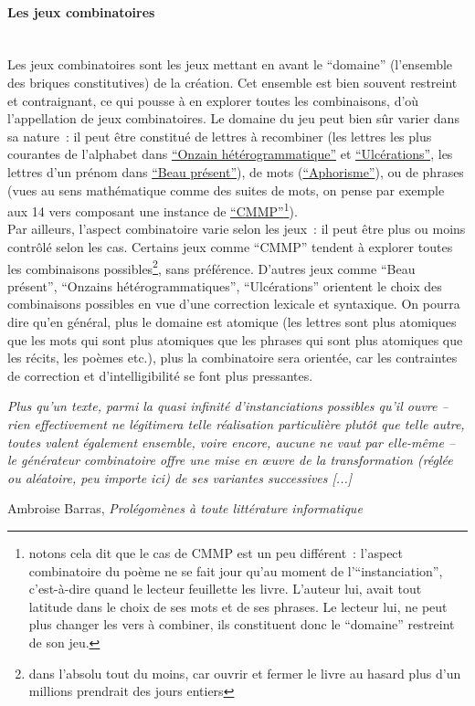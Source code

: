 \documentclass{article}
\newcommand{\subsubsubsection}[1]{\paragraph{#1}\mbox{}\\}
\newenvironment{citationbox}
{\begin{center}
		\begin{minipage}{.8\textwidth}
		}
		{
		\end{minipage}	
\end{center}
}
\begin{document}
				\subsubsubsection{Les jeux combinatoires}
					Les jeux combinatoires sont les jeux mettant en avant le ``domaine'' (l'ensemble des briques constitutives) de la création. Cet ensemble est bien souvent restreint et contraignant, ce qui pousse à en explorer toutes les combinaisons, d'où l'appellation de jeux combinatoires. Le domaine du jeu peut bien sûr varier dans sa nature~: il peut être constitué de lettres à recombiner (les lettres les plus courantes de l'alphabet dans \href{http://oulipo.net/fr/contraintes/onzain-heterogrammatique}{``Onzain hétérogrammatique''} et \href{http://oulipo.net/fr/contraintes/ulcerations}{``Ulcérations''}, les lettres d'un prénom dans \href{http://oulipo.net/fr/contraintes/beau-present}{``Beau présent''}), de mots (\href{http://oulipo.net/fr/contraintes/aphorisme}{``Aphorisme''}), ou de phrases (vues au sens mathématique comme des suites de mots, on pense par exemple aux 14 vers composant une instance de \href{http://oulipo.net/fr/contraintes/cmmp}{``CMMP''}\footnote{notons cela dit que le cas de CMMP est un peu différent~: l'aspect combinatoire du poème ne se fait jour qu'au moment de l'``instanciation'', c'est-à-dire quand le lecteur feuillette les livre. L'auteur lui, avait tout latitude dans le choix de ses mots et de ses phrases. Le lecteur lui, ne peut plus changer les vers à combiner, ils constituent donc le ``domaine'' restreint de son jeu.}).\\
				
					Par ailleurs, l'aspect combinatoire varie selon les jeux~: il peut être plus ou moins contrôlé selon les cas. Certains jeux comme ``CMMP'' tendent à explorer toutes les combinaisons possibles\footnote{dans l'absolu tout du moins, car ouvrir et fermer le livre au hasard plus d'un millions prendrait des jours entiers}, sans préférence. D'autres jeux comme ``Beau présent'', ``Onzains hétérogrammatiques'', ``Ulcérations'' orientent le choix des combinaisons possibles en vue d'une correction lexicale et syntaxique. On pourra dire qu'en général, plus le domaine est atomique (les lettres sont plus atomiques que les mots qui sont plus atomiques que les phrases qui sont plus atomiques que les récits, les poèmes etc.), plus la combinatoire sera orientée, car les contraintes de correction et d'intelligibilité se font plus pressantes.
				
					
					\begin{citationbox}
						\textit{Plus qu'un texte, parmi la quasi infinité d'instanciations possibles qu'il ouvre -- rien effectivement ne
					légitimera telle réalisation particulière plutôt que telle autre, toutes valent
					également ensemble, voire encore, aucune ne vaut par elle-même -- le
					générateur combinatoire offre une mise en œuvre de la transformation
					(réglée ou aléatoire, peu importe ici) de ses variantes successives [...]}
					\begin{flushright}
						Ambroise Barras, \textit{Prolégomènes à toute littérature informatique} \cite{barras1995}
					\end{flushright}
					\end{citationbox}
				
\end{document}
